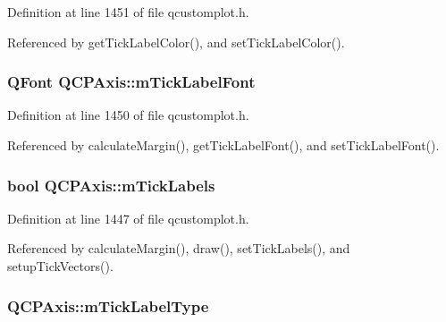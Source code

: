 Definition at line 1451 of file qcustomplot.\+h.



Referenced by get\+Tick\+Label\+Color(), and set\+Tick\+Label\+Color().

\hypertarget{class_q_c_p_axis_add79d1e39c4ed65869a1e9cc79043f3f}{}
\subsubsection[{m\+Tick\+Label\+Font}]{\setlength{\rightskip}{0pt plus 5cm}Q\+Font Q\+C\+P\+Axis\+::m\+Tick\+Label\+Font\hspace{0.3cm}{\ttfamily [protected]}}\label{class_q_c_p_axis_add79d1e39c4ed65869a1e9cc79043f3f}


Definition at line 1450 of file qcustomplot.\+h.



Referenced by calculate\+Margin(), get\+Tick\+Label\+Font(), and set\+Tick\+Label\+Font().

\hypertarget{class_q_c_p_axis_a3e4315be072026644e69009557a2fa11}{}
\subsubsection[{m\+Tick\+Labels}]{\setlength{\rightskip}{0pt plus 5cm}bool Q\+C\+P\+Axis\+::m\+Tick\+Labels\hspace{0.3cm}{\ttfamily [protected]}}\label{class_q_c_p_axis_a3e4315be072026644e69009557a2fa11}


Definition at line 1447 of file qcustomplot.\+h.



Referenced by calculate\+Margin(), draw(), set\+Tick\+Labels(), and setup\+Tick\+Vectors().

\hypertarget{class_q_c_p_axis_a6e056c1cb1aab0eddebfebbcb78c8f90}{}
\subsubsection[{m\+Tick\+Label\+Type}]{ Q\+C\+P\+Axis\+::m\+Tick\+Label\+Type\hspace{0.3cm}{\ttfamily [protected]}}\label{class_q_c_p_axis_a6e056c1cb1aab0eddebfebbcb78c8f90}


